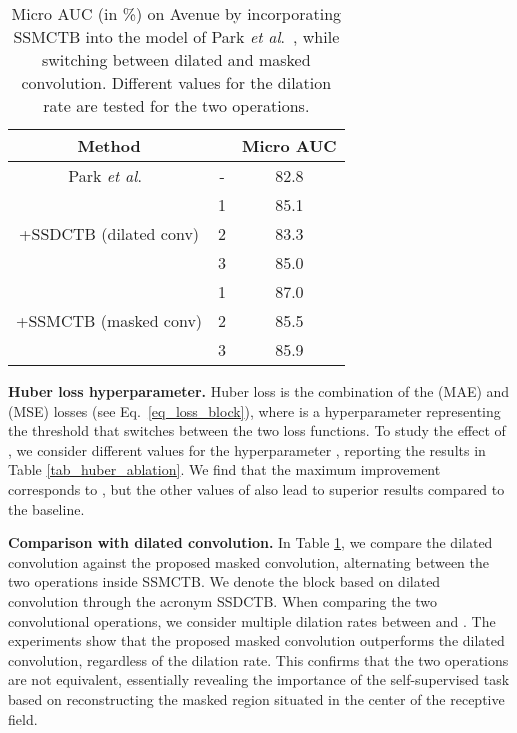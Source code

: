 \documentclass[10pt,journal,compsoc]{IEEEtran}
\newcommand{\etal}{\textit{et al}.}
\begin{document}
\begin{table}[!t]
\centering 
\caption{Micro AUC (in \%) on Avenue by incorporating SSMCTB into the model of Park \etal~\cite{Park-CVPR-2020}, while switching between dilated and masked convolution. Different values for the dilation rate  are tested for the two operations.}
\label{tab_comparison_with_dilation}
\vspace{-0.2cm}
\setlength\tabcolsep{4.0pt}
\small
\begin{tabular}{| c | c | c |} 
\hline
 {{Method}} &  &  Micro AUC  \\
 \hline
 \hline
  {Park \etal~\cite{Park-CVPR-2020}} & - & 82.8 \\
  \hline
  \multirow{3}{*}{+SSDCTB (dilated conv)}  & 1 & 85.1 \\
  & 2 & 83.3  \\
  & 3 & 85.0  \\
  \hline
  \multirow{3}{*}{+SSMCTB (masked conv)}  & 1 & 87.0  \\
    & 2 & 85.5  \\
    & 3 & 85.9  \\
  \hline
  \end{tabular}
\vspace{0.1cm}
\end{table}

\noindent
\textbf{Huber loss hyperparameter.}
Huber loss is the combination of the  (MAE) and  (MSE) losses (see Eq.~\eqref{eq_loss_block}), where  is a hyperparameter representing the threshold that switches between the two loss functions. To study the effect of , we consider different values for the hyperparameter , reporting the results in Table \ref{tab_huber_ablation}. We find that the maximum improvement corresponds to , but the other values of  also lead to superior results compared to the baseline.

\noindent
\textbf{Comparison with dilated convolution.}
In Table \ref{tab_comparison_with_dilation}, we compare the dilated convolution against the proposed masked convolution, alternating between the two operations inside SSMCTB. We denote the block based on dilated convolution through the acronym SSDCTB. When comparing the two convolutional operations, we consider multiple dilation rates between  and . The experiments show that the proposed masked convolution outperforms the dilated convolution, regardless of the dilation rate. This confirms that the two operations are not equivalent, essentially revealing the importance of the self-supervised task based on reconstructing the masked region  situated in the center of the receptive field. 
\end{document}
